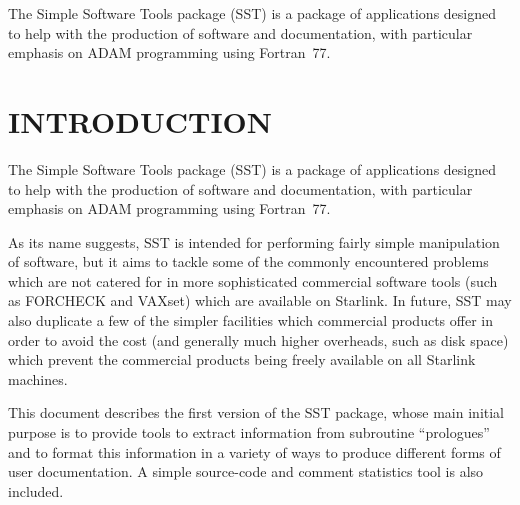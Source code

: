 \documentclass[twoside,11pt]{article}
\newcommand{\stardocinitials}  {SUN}
\newcommand{\stardoccopyright} 
{Copyright \copyright\ 2000 Council for the Central Laboratory of the Research Councils}
\newcommand{\stardocnumber}    {110.2}
\newcommand{\stardocabstract}  {
The Simple Software Tools package (SST) is a package of applications
designed to help with the production of software and documentation, with
particular emphasis on ADAM programming using Fortran~77.
}
\newcommand{\stardocname}{\stardocinitials /\stardocnumber}
\newenvironment{latexonly}{}{}
\renewcommand{\_}{\texttt{\symbol{95}}}
\renewcommand{\thepage}{\roman{page}}
\begin{document}
\stardocabstract


  \newpage
  \begin{latexonly}
    \setlength{\parskip}{0mm}
    \tableofcontents
    \setlength{\parskip}{\medskipamount}
    \markboth{\stardocname}{\stardocname}
  \end{latexonly}

\cleardoublepage
\renewcommand{\thepage}{\arabic{page}}
\setcounter{page}{1}

\section{INTRODUCTION}

The Simple Software Tools package (SST) is a package of applications
designed to help with the production of software and documentation, with
particular emphasis on ADAM programming using Fortran~77.

As its name suggests, SST is intended for performing fairly simple
manipulation of software, but it aims to tackle some of the
commonly encountered problems which are not catered for in more
sophisticated commercial software tools (such as FORCHECK and VAXset) which
are available on Starlink.
In future, SST may also duplicate a few of the simpler facilities which
commercial products offer in order to avoid the cost (and generally much
higher overheads, such as disk space) which prevent the commercial products
being freely available on all Starlink machines.

This document describes the first version of the SST package, whose main
initial purpose is to provide tools to extract information from subroutine
``prologues'' and to format this information in a variety of ways to produce
different forms of user documentation.
A simple source-code and comment statistics tool is also included.
\end{document}
